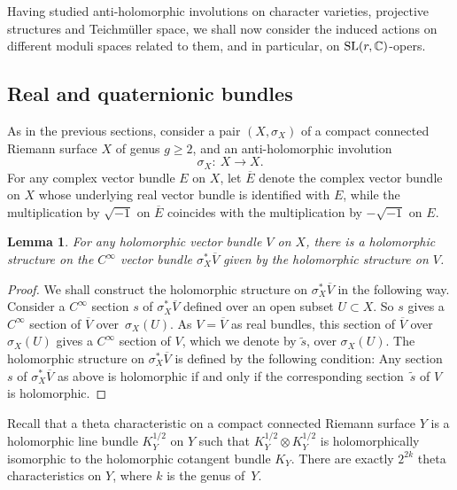 \documentclass[pdftex]{sigma}
\numberwithin{equation}{section}
\newtheorem{Lemma}[Theorem]{Lemma}
\begin{document}
Having studied anti-holomorphic involutions on character varieties, projective structures and Teichm\"uller space, we shall now consider
the induced actions on different moduli spaces related to them, and in particular, on ${\rm SL}(r,\mathbb{C})$-opers.

\subsection{Real and quaternionic bundles}\label{invo}
As in the previous sections, consider a pair $(X, \sigma_X)$ of a compact connected Riemann surface $X$ of genus
$ g \geq 2$, and an anti-holomorphic involution
\begin{equation}\label{e18}
\sigma_X\colon\ X \longrightarrow X.
\end{equation}
For any complex vector bundle $E$ on $X$, let $\overline{E}$ denote the
complex vector bundle on $X$ whose underlying real vector bundle is identified with $E$, while the multiplication
by $\sqrt{-1}$ on $\overline{E}$ coincides with the multiplication by $-\sqrt{-1}$ on $E$.

\begin{Lemma}For any holomorphic vector bundle $V$ on $X$, there is a holomorphic structure
on the $C^\infty$ vector bundle $\sigma^*_X \overline{V}$ given by the holomorphic structure on $V$.
\end{Lemma}

\begin{proof}
We shall construct the holomorphic structure on $\sigma^*_X \overline{V}$ in the following way. Consider a
$C^\infty$ section $s$ of $\sigma^*_X\overline{V}$ defined over an open subset
$U \subset X$. So $s$ gives a $C^\infty$ section of $\overline{V}$ over~$\sigma_X(U)$.
As $V = \overline{V}$ as real bundles, this section of $\overline{V}$ over $\sigma_X(U)$
gives a $C^\infty$ section of $V$, which we denote by $\widetilde{s}$, over $\sigma_X(U)$.
The holomorphic structure on $\sigma^*_X \overline{V}$ is defined by the following condition:
Any section~$s$ of $\sigma^*_X\overline{V}$ as above is holomorphic if and only if the corresponding section~$\widetilde{s}$ of $V$ is holomorphic.\end{proof}

Recall that a theta characteristic on a compact connected Riemann surface $Y$ is a holomorphic line
bundle $K^{1/2}_Y$ on $Y$ such that $K^{1/2}_Y\otimes K^{1/2}_Y$ is holomorphically isomorphic to
the holomorphic cotangent bundle $K_Y$. There are exactly $2^{2k}$ theta characteristics on $Y$, where
$k$ is the genus of~$Y$.
\end{document}
